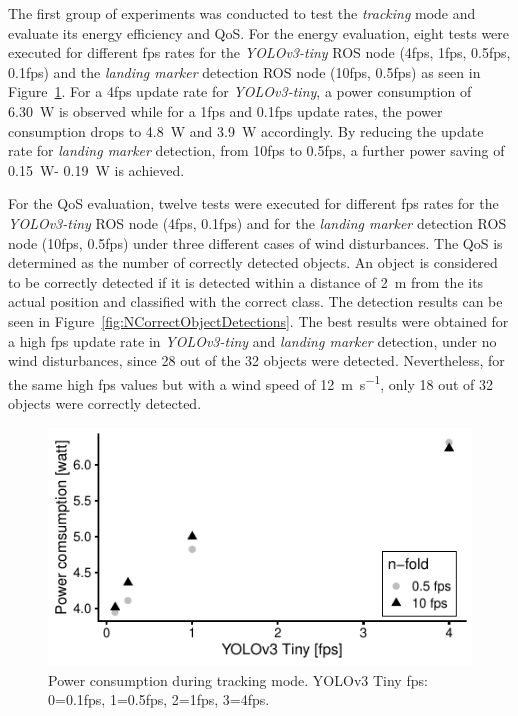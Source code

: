 \documentclass[conference]{IEEEtran}
\begin{document}
The first group of experiments was conducted to test the \emph{tracking} mode and evaluate its 
energy efficiency and QoS. For the energy 
evaluation, eight tests were executed for different fps rates 
for the \emph{YOLOv3-tiny} ROS node (4fps, 1fps, 0.5fps, 0.1fps) and 
the \emph{landing marker} detection ROS node (10fps, 0.5fps) as 
%
seen in Figure~\ref{fig:PowerDuringTracking}. For a 4fps update rate
for \emph{YOLOv3-tiny}, a power consumption of \SI{6.30}{\watt} is observed while
for a 1fps and 0.1fps update rates, the power consumption drops to
\SI{4,8}{\watt} and \SI{3.9}{\watt} accordingly. By reducing the update rate for
\emph{landing marker} detection, from 10fps to 0.5fps, a further power
saving of \SI{0.15}{\watt}- \SI{0.19}{\watt} is achieved.



For the QoS evaluation, twelve tests were executed for different 
fps rates for the \emph{YOLOv3-tiny} ROS node (4fps, 0.1fps) and for 
the \emph{landing marker} detection ROS node (10fps, 0.5fps) under 
three different cases of wind disturbances. 
%
The QoS is determined as the number of correctly detected objects. An
object is considered to be correctly detected if it is detected within
a distance of \SI{2}{\meter} from the its actual position and classified with
the correct class. The detection results can be seen in
Figure~\ref{fig:NCorrectObjectDetections}. The best results were
obtained for a high fps update rate in \emph{YOLOv3-tiny} and \emph{landing marker} detection, under no wind disturbances, since 28 out of the 32
objects were detected. Nevertheless, for the same high fps values but
with a wind speed of \SI{12}{\meter \per \second}, only 18 out of 32 objects were
correctly detected.



\begin{figure}[t]
\centering
\includegraphics{data_visualization/PowerDetection.pdf}
\caption{Power consumption during tracking mode. YOLOv3 Tiny fps:
  0=0.1fps, 1=0.5fps, 2=1fps, 3=4fps.}
\label{fig:PowerDuringTracking}
\end{figure}
\end{document}

